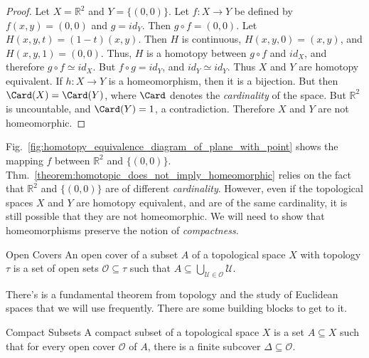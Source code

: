 \documentclass[crop=false,class=book,oneside]{standalone}                      %
\begin{document}
            \begin{proof}
                Let $X=\mathbb{R}^{2}$ and $Y=\{(0,0)\}$.
                Let $f:{X}\rightarrow{Y}$ be defined by
                $f(x,y)=(0,0)$ and $g=id_{Y}$. Then
                $g\circ{f}=(0,0)$. Let $H(x,y,t)=(1-t)(x,y)$.
                Then $H$ is continuous, $H(x,y,0)=(x,y)$,
                and $H(x,y,1)=(0,0)$. Thus, $H$ is a
                homotopy between ${g}\circ{f}$ and $id_{X}$, and
                therefore ${g}\circ{f}\simeq{id_{X}}$. But
                ${f}\circ{g}=id_{Y}$, and ${id_{Y}}\simeq{id_{Y}}$.
                Thus $X$ and $Y$ are homotopy equivalent.
                If $h:{X}\rightarrow{Y}$ is a homeomorphism, then it is a
                bijection. But then $\Card(X)=\Card(Y)$,
                where $\Card$ denotes the \textit{cardinality} of the space.
                But $\mathbb{R}^{2}$ is uncountable, and $\Card(Y)=1$,
                a contradiction. Therefore $X$ and $Y$ are not homeomorphic.
            \end{proof}
            Fig.~\ref{fig:homotopy_equivalence_diagram_of_plane_with_point}
            shows the mapping $f$ between $\mathbb{R}^{2}$ and $\{(0,0)\}$.
            Thm.~\ref{theorem:homotopic_does_not_imply_homeomorphic}
            relies on the fact that $\mathbb{R}^{2}$ and $\{(0,0)\}$
            are of different \textit{cardinality}. However, even
            if the topological spaces $X$ and $Y$ are homotopy
            equivalent, and are of the same cardinality, it is
            still possible that they are not homeomorphic.
            We will need to show that homeomorphisms preserve
            the notion of \textit{compactness}.
            \begin{ldefinition}{Open Covers}
                An open cover of a subset $A$ of a topological
                space $X$ with topology $\tau$
                is a set of open sets
                $\mathcal{O}\subseteq\tau$ such that
                $A\subseteq\bigcup_{\mathcal{U}\in\mathcal{O}}\mathcal{U}$.
            \end{ldefinition}
            There's is a fundamental theorem from topology and
            the study of Euclidean spaces that we will use frequently.
            There are some building blocks to get to it.
            \begin{ldefinition}{Compact Subsets}
                A compact subset of a topological space $X$ is a
                set $A\subseteq{X}$ such that for every open cover
                $\mathcal{O}$ of $A$, there is a finite subcover
                $\Delta\subseteq\mathcal{O}$.
            \end{ldefinition}
\end{document}

